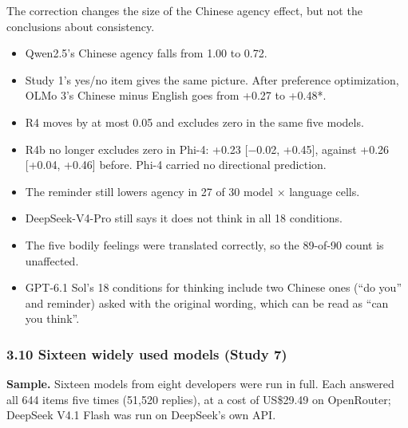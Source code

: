 \documentclass[
  11pt,
]{article}
\providecommand{\tightlist}{%
  \setlength{\itemsep}{0pt}\setlength{\parskip}{0pt}}
\begin{document}
The correction changes the size of the Chinese agency effect, but not
the conclusions about consistency.

\begin{itemize}
\tightlist
\item
  Qwen2.5's Chinese agency falls from 1.00 to 0.72.
\item
  Study 1's yes/no item gives the same picture. After preference
  optimization, OLMo 3's Chinese minus English goes from +0.27 to
  +0.48*.
\item
  R4 moves by at most 0.05 and excludes zero in the same five models.
\item
  R4b no longer excludes zero in Phi-4: +0.23 {[}−0.02, +0.45{]},
  against +0.26 {[}+0.04, +0.46{]} before. Phi-4 carried no directional
  prediction.
\item
  The reminder still lowers agency in 27 of 30 model × language cells.
\item
  DeepSeek-V4-Pro still says it does not think in all 18 conditions.
\item
  The five bodily feelings were translated correctly, so the 89-of-90
  count is unaffected.
\item
  GPT-6.1 Sol's 18 conditions for thinking include two Chinese ones
  (``do you'' and reminder) asked with the original wording, which can
  be read as ``can you think''.
\end{itemize}

\hypertarget{sixteen-widely-used-models-study-7}{%
\subsubsection{3.10 Sixteen widely used models (Study
7)}\label{sixteen-widely-used-models-study-7}}

\textbf{Sample.} Sixteen models from eight developers were run in full.
Each answered all 644 items five times (51,520 replies), at a cost of
US\$29.49 on OpenRouter; DeepSeek V4.1 Flash was run on DeepSeek's own
API.
\end{document}
